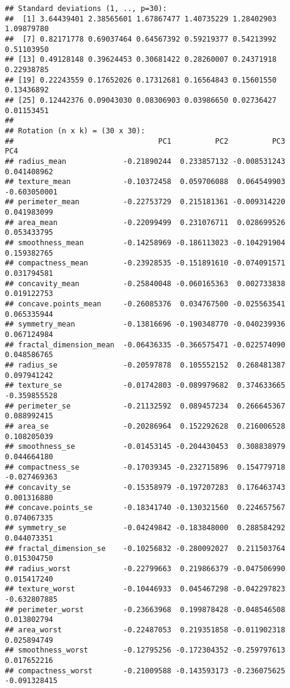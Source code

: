 \documentclass[
]{article}
\begin{document}
\begin{verbatim}
## Standard deviations (1, .., p=30):
##  [1] 3.64439401 2.38565601 1.67867477 1.40735229 1.28402903 1.09879780
##  [7] 0.82171778 0.69037464 0.64567392 0.59219377 0.54213992 0.51103950
## [13] 0.49128148 0.39624453 0.30681422 0.28260007 0.24371918 0.22938785
## [19] 0.22243559 0.17652026 0.17312681 0.16564843 0.15601550 0.13436892
## [25] 0.12442376 0.09043030 0.08306903 0.03986650 0.02736427 0.01153451
## 
## Rotation (n x k) = (30 x 30):
##                                 PC1          PC2          PC3          PC4
## radius_mean             -0.21890244  0.233857132 -0.008531243  0.041408962
## texture_mean            -0.10372458  0.059706088  0.064549903 -0.603050001
## perimeter_mean          -0.22753729  0.215181361 -0.009314220  0.041983099
## area_mean               -0.22099499  0.231076711  0.028699526  0.053433795
## smoothness_mean         -0.14258969 -0.186113023 -0.104291904  0.159382765
## compactness_mean        -0.23928535 -0.151891610 -0.074091571  0.031794581
## concavity_mean          -0.25840048 -0.060165363  0.002733838  0.019122753
## concave.points_mean     -0.26085376  0.034767500 -0.025563541  0.065335944
## symmetry_mean           -0.13816696 -0.190348770 -0.040239936  0.067124984
## fractal_dimension_mean  -0.06436335 -0.366575471 -0.022574090  0.048586765
## radius_se               -0.20597878  0.105552152  0.268481387  0.097941242
## texture_se              -0.01742803 -0.089979682  0.374633665 -0.359855528
## perimeter_se            -0.21132592  0.089457234  0.266645367  0.088992415
## area_se                 -0.20286964  0.152292628  0.216006528  0.108205039
## smoothness_se           -0.01453145 -0.204430453  0.308838979  0.044664180
## compactness_se          -0.17039345 -0.232715896  0.154779718 -0.027469363
## concavity_se            -0.15358979 -0.197207283  0.176463743  0.001316880
## concave.points_se       -0.18341740 -0.130321560  0.224657567  0.074067335
## symmetry_se             -0.04249842 -0.183848000  0.288584292  0.044073351
## fractal_dimension_se    -0.10256832 -0.280092027  0.211503764  0.015304750
## radius_worst            -0.22799663  0.219866379 -0.047506990  0.015417240
## texture_worst           -0.10446933  0.045467298 -0.042297823 -0.632807885
## perimeter_worst         -0.23663968  0.199878428 -0.048546508  0.013802794
## area_worst              -0.22487053  0.219351858 -0.011902318  0.025894749
## smoothness_worst        -0.12795256 -0.172304352 -0.259797613  0.017652216
## compactness_worst       -0.21009588 -0.143593173 -0.236075625 -0.091328415

\end{verbatim}
\end{document}
